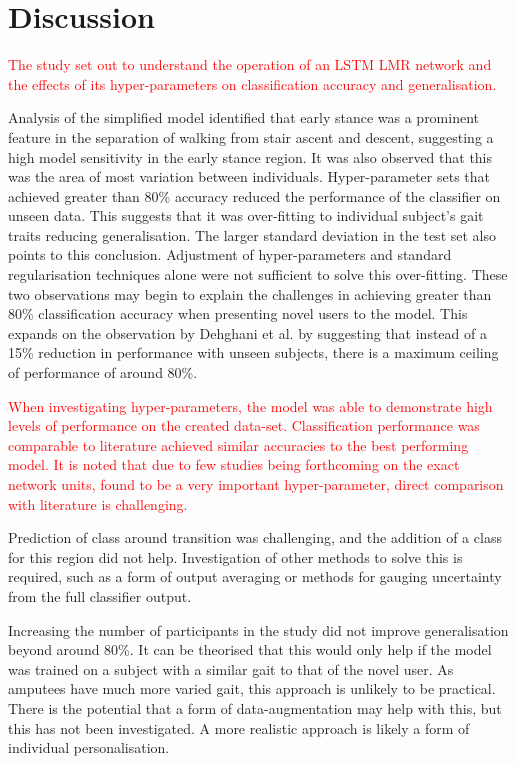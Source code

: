 \documentclass[sensors,article,submit,moreauthors,pdftex]{Definitions/mdpi}
\begin{document}
\section{Discussion}
\label{sec:discussion}
\textcolor{red}{The study set out to understand the operation of an LSTM LMR network and the effects of its hyper-parameters on classification accuracy and generalisation.}

Analysis of the simplified model identified that early stance was a prominent feature in the separation of walking from stair ascent and descent, suggesting a high model sensitivity in the early stance region. It was also observed that this was the area of most variation between individuals. Hyper-parameter sets that achieved greater than 80\% accuracy reduced the performance of the classifier on unseen data. This suggests that it was over-fitting to individual subject's gait traits reducing generalisation. The larger standard deviation in the test set also points to this conclusion. Adjustment of hyper-parameters and standard regularisation techniques alone were not sufficient to solve this over-fitting. These two observations may begin to explain the challenges in achieving greater than 80\% classification accuracy when presenting novel users to the model. This expands on the observation by Dehghani et al. \cite{Dehghani2019} by suggesting that instead of a 15\% reduction in performance with unseen subjects, there is a maximum ceiling of performance of around 80\%.

\textcolor{red}{When investigating hyper-parameters, the model was able to demonstrate high levels of performance on the created data-set. Classification performance was comparable to literature achieved similar accuracies to the best performing model. It is noted that due to few studies being forthcoming on the exact network units, found to be a very important hyper-parameter, direct comparison with literature is challenging.}

Prediction of class around transition was challenging, and the addition of a class for this region did not help. Investigation of other methods to solve this is required, such as a form of output averaging or methods for gauging uncertainty from the full classifier output.

Increasing the number of participants in the study did not improve generalisation beyond around 80\%. It can be theorised that this would only help if the model was trained on a subject with a similar gait to that of the novel user. As amputees have much more varied gait, this approach is unlikely to be practical. There is the potential that a form of data-augmentation may help with this, but this has not been investigated. A more realistic approach is likely a form of individual personalisation.
\end{document}
